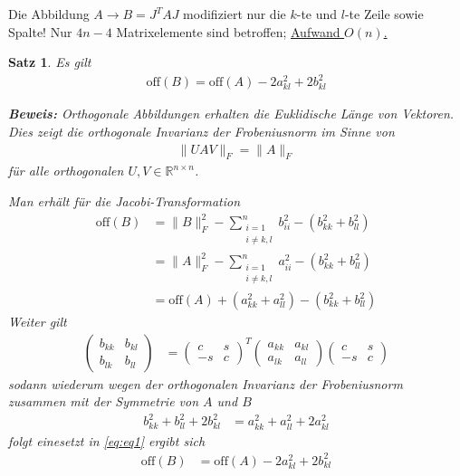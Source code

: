\documentclass[%
a4paper,
11pt,		%
]
{scrartcl}
\newcommand{\R}{\mathbb{R}}
\newcommand{\off}{\text{off}}
\theoremstyle{plain}
\theoremstyle{plain}
\newtheorem{mysatz}[mydef]{Satz}
\theoremstyle{plain}
\theoremstyle{plain}
\begin{document}
Die Abbildung $A \rightarrow B = J^T A J$ modifiziert nur die $k$-te und $l$-te Zeile sowie Spalte! Nur $4n-4$ Matrixelemente sind betroffen; \uline{Aufwand $O(n)$.}


\begin{mysatz}
Es gilt
\begin{align*}
  \off(B) = \off(A) - 2 a_{kl}^2 + 2b_{kl}^2 
\end{align*}

\newpage

\textbf{Beweis:}
Orthogonale Abbildungen erhalten die Euklidische Länge von Vektoren. Dies zeigt die orthogonale Invarianz der Frobeniusnorm im Sinne von
\begin{align*}
\|UAV\|_F = \|A\|_F
\end{align*}
für alle orthogonalen $U,V \in \R^{n \times n}$.

Man erhält für die Jacobi-Transformation
\begin{align*}
  \off(B)   & = \|B\|_F^2 - \sum\limits_{\substack{i=1\\ i \neq k,l}}^n b_{ii}^2 - \left( b_{kk}^2 + b_{ll}^2 \right)\\
            & = \|A\|_F^2 - \sum\limits_{\substack{i=1\\ i \neq k,l}}^n a_{ii}^2 - \left( b_{kk}^2 + b_{ll}^2 \right)\\
            & = \off(A) + (a_{kk}^2 + a_{ll}^2) - (b_{kk}^2+b_{ll}^2)\label{eq:eq1}\tag{1}
\end{align*}
Weiter gilt
\begin{align*}
\begin{pmatrix}
b_{kk} & b_{kl}\\
b_{lk} & b_{ll}
\end{pmatrix}
& = 
\begin{pmatrix}
c & s\\
-s & c
\end{pmatrix}^T
\begin{pmatrix}
a_{kk} & a_{kl}\\
a_{lk} & a_{ll}
\end{pmatrix}
\begin{pmatrix}
c & s\\
-s & c
\end{pmatrix}
\end{align*}
sodann wiederum wegen der orthogonalen Invarianz der Frobeniusnorm zusammen mit der Symmetrie von $A$ und $B$
\begin{align*}
b_{kk}^2 + b_{ll}^2 + 2b_{kl}^2 & = a_{kk}^2 + a_{ll}^2 + 2a_{kl}^2
\end{align*}
folgt einesetzt in \eqref{eq:eq1} ergibt sich
\begin{align*}
\off(B) & = \off(A) - 2a_{kl}^2 + 2b_{kl}^2
\end{align*}
\
\end{mysatz}
\end{document}
